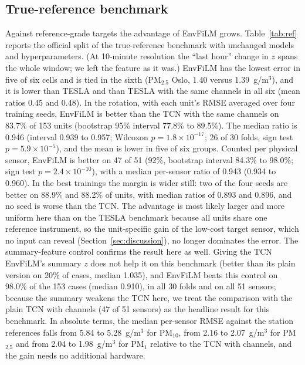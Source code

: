 \documentclass[journal]{IEEEtran}
\newcommand{\PMten}{PM$_{10}$}
\newcommand{\PMtwo}{PM$_{2.5}$}
\newcommand{\PMone}{PM$_{1}$}
\newcommand{\ugm}{\textmu g/m$^3$}
\begin{document}
\subsection{True-reference benchmark}
\label{sec:ref}

Against reference-grade targets the advantage of EnvFiLM grows. Table~\ref{tab:ref} reports the official split of the
true-reference benchmark with unchanged models and hyperparameters. (At 10-minute resolution the ``last hour'' change
in $z$ spans the whole window; we left the feature as it was.) EnvFiLM has the lowest error in five of six cells and is
tied in the sixth (\PMtwo{} Oslo, 1.40 versus 1.39~\ugm{}), and it is lower than TESLA and than TESLA with the same channels in
all six (mean ratios 0.45 and 0.48). In the rotation, with each unit's RMSE averaged over four training seeds, EnvFiLM
is better than the TCN with the same channels on 83.7\% of 153 units (bootstrap 95\% interval 77.8\% to 89.5\%). The
median ratio is 0.946 (interval 0.939 to 0.957; Wilcoxon $p = 1.8\times10^{-17}$; 26 of 30 folds, sign test
$p = 5.9\times10^{-5}$), and the mean is lower in five of six groups. Counted per physical
sensor, EnvFiLM is better on 47 of 51 (92\%, bootstrap interval 84.3\% to 98.0\%; sign test
$p = 2.4\times10^{-10}$), with a median per-sensor ratio of 0.943 (0.934 to 0.960). In the best trainings the margin is wider still:
two of the four seeds are better on 88.9\% and 88.2\% of units, with median ratios of 0.893 and 0.896, and no seed is
worse than the TCN. The advantage is most likely larger and more uniform here than on the TESLA benchmark because all units
share one reference instrument, so the unit-specific gain of the low-cost target sensor, which no input can reveal
(Section~\ref{sec:discussion}), no longer dominates the error. The summary-feature control confirms the result here
as well. Giving the TCN EnvFiLM's summary $z$ does not help it on this benchmark (better than its plain version on 20\%
of cases, median 1.035), and EnvFiLM beats this control on 98.0\% of the 153 cases (median 0.910), in all 30 folds and
on all 51 sensors; because the summary weakens the TCN here, we treat the comparison with the plain TCN with channels
(47 of 51 sensors) as the headline result for this benchmark. In absolute terms, the median per-sensor RMSE against
the station references falls from 5.84 to 5.28~\ugm{} for \PMten, from 2.16 to 2.07~\ugm{} for \PMtwo{} and from 2.04
to 1.98~\ugm{} for \PMone{} relative to the TCN with channels, and the gain needs no additional hardware.
\end{document}
